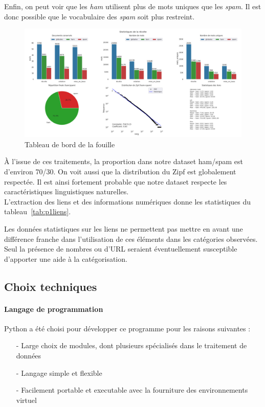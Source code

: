     Enfin, on peut voir que les \emph{ham} utilisent plus de mots uniques que les \emph{spam}.
    Il est donc possible que le vocabulaire des \emph{spam} soit plus restreint.
    \begin{figure}[H]
        \includegraphics[width=\linewidth]{img/fouilleStats}
        \caption{Tableau de bord de la fouille}
        \label{fig:dashFouille}
    \end{figure}

    À l'issue de ces traitements, la proportion dans notre dataset ham/spam est d'environ 70/30.
    On voit aussi que la distribution du Zipf est globalement respectée.
    Il est ainsi fortement probable que notre dataset respecte les caractéristiques linguistiques naturelles.\\

    L'extraction des liens et des informations numériques donne les statistiques du tableau~\ref{tab:p1liens}.

    Les données statistiques sur les liens ne permettent pas mettre en avant une différence franche dans l'utilisation de ces éléments dans les catégories observées.
    Seul la présence de nombres ou d'URL seraient éventuellement susceptible d'apporter une aide à la catégorisation.
    

\subsection*{Choix techniques}
    \paragraph{Langage de programmation}
        Python a été choisi pour développer ce programme pour les raisons suivantes :
        \begin{itemize}
            \item[-] Large choix de modules, dont plusieurs spécialisés dans le traitement de données
            \item[-] Langage simple et flexible
            \item[-] Facilement portable et executable avec la fourniture des environnements virtuel
        \end{itemize}

